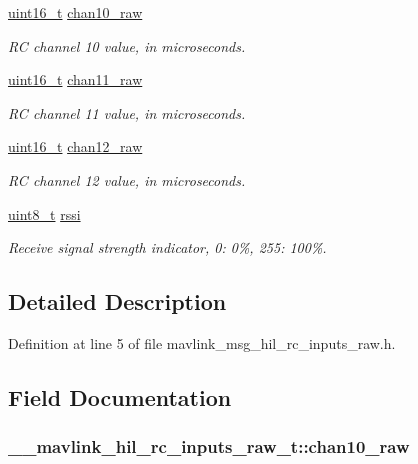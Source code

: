\begin{DoxyCompactItemize}
\hyperlink{stdint_8h_a273cf69d639a59973b6019625df33e30}{uint16\-\_\-t} \hyperlink{struct____mavlink__hil__rc__inputs__raw__t_ac49fe649301c639a71ae5a5778934a3c}{chan10\-\_\-raw}
\begin{DoxyCompactList}\small\item\em R\-C channel 10 value, in microseconds. \end{DoxyCompactList}\item 
\hyperlink{stdint_8h_a273cf69d639a59973b6019625df33e30}{uint16\-\_\-t} \hyperlink{struct____mavlink__hil__rc__inputs__raw__t_a09b92c1ec569948809c152e74bd61655}{chan11\-\_\-raw}
\begin{DoxyCompactList}\small\item\em R\-C channel 11 value, in microseconds. \end{DoxyCompactList}\item 
\hyperlink{stdint_8h_a273cf69d639a59973b6019625df33e30}{uint16\-\_\-t} \hyperlink{struct____mavlink__hil__rc__inputs__raw__t_a5967e01d1c858a6136505185d183a99e}{chan12\-\_\-raw}
\begin{DoxyCompactList}\small\item\em R\-C channel 12 value, in microseconds. \end{DoxyCompactList}\item 
\hyperlink{stdint_8h_aba7bc1797add20fe3efdf37ced1182c5}{uint8\-\_\-t} \hyperlink{struct____mavlink__hil__rc__inputs__raw__t_aa126d8b574a26544c57605c5aa1f8684}{rssi}
\begin{DoxyCompactList}\small\item\em Receive signal strength indicator, 0\-: 0\%, 255\-: 100\%. \end{DoxyCompactList}\end{DoxyCompactItemize}


\subsection{Detailed Description}


Definition at line 5 of file mavlink\-\_\-msg\-\_\-hil\-\_\-rc\-\_\-inputs\-\_\-raw.\-h.



\subsection{Field Documentation}
\hypertarget{struct____mavlink__hil__rc__inputs__raw__t_ac49fe649301c639a71ae5a5778934a3c}{
\subsubsection[{chan10\-\_\-raw}]{ \-\_\-\-\_\-mavlink\-\_\-hil\-\_\-rc\-\_\-inputs\-\_\-raw\-\_\-t\-::chan10\-\_\-raw}}\label{struct____mavlink__hil__rc__inputs__raw__t_ac49fe649301c639a71ae5a5778934a3c}


